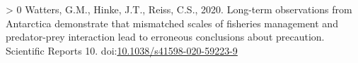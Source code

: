 \documentclass[]{elsarticle} %
\newlength{\cslhangindent}
\newenvironment{CSLReferences}[3] %
 {%
  \setlength{\parindent}{0pt}
  \ifodd #1 \everypar{\setlength{\hangindent}{\cslhangindent}}\ignorespaces\fi
  \ifnum #2 > 0
  \setlength{\parskip}{#2\baselineskip}
  \fi
 }%
 {}
\begin{document}
\begin{CSLReferences}{1}{0}
\leavevmode\hypertarget{ref-Watters2020}{}%
Watters, G.M., Hinke, J.T., Reiss, C.S., 2020. Long-term observations
from {Antarctica} demonstrate that mismatched scales of fisheries
management and predator-prey interaction lead to erroneous conclusions
about precaution. Scientific Reports 10.
doi:\href{https://doi.org/10.1038/s41598-020-59223-9}{10.1038/s41598-020-59223-9}

\end{CSLReferences}
\end{document}
